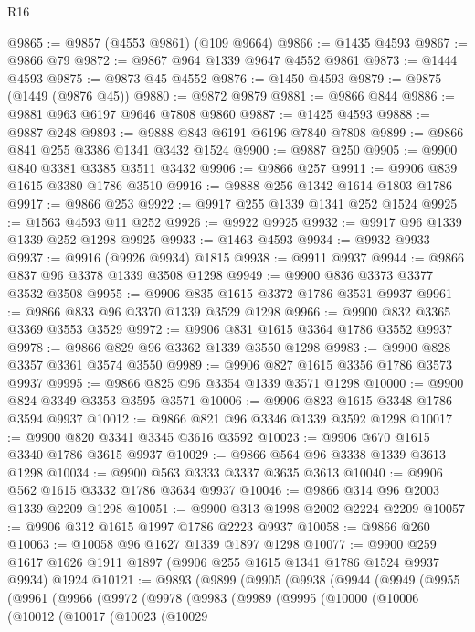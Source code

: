 \begin{lexlean}{R16}
\begin{coremodule}
@9865 := @9857 (@4553 @9861) (@109 @9664)
@9866 := @1435 @4593
@9867 := @9866 @79
@9872 := @9867 @964 @1339 @9647 @4552 @9861
@9873 := @1444 @4593
@9875 := @9873 @45 @4552
@9876 := @1450 @4593
@9879 := @9875 (@1449 (@9876 @45))
@9880 := @9872 @9879
@9881 := @9866 @844
@9886 := @9881 @963 @6197 @9646 @7808 @9860
@9887 := @1425 @4593
@9888 := @9887 @248
@9893 := @9888 @843 @6191 @6196 @7840 @7808
@9899 := @9866 @841 @255 @3386 @1341 @3432 @1524
@9900 := @9887 @250
@9905 := @9900 @840 @3381 @3385 @3511 @3432
@9906 := @9866 @257
@9911 := @9906 @839 @1615 @3380 @1786 @3510
@9916 := @9888 @256 @1342 @1614 @1803 @1786
@9917 := @9866 @253
@9922 := @9917 @255 @1339 @1341 @252 @1524
@9925 := @1563 @4593 @11 @252
@9926 := @9922 @9925
@9932 := @9917 @96 @1339 @1339 @252 @1298 @9925
@9933 := @1463 @4593
@9934 := @9932 @9933
@9937 := @9916 (@9926 @9934) @1815
@9938 := @9911 @9937
@9944 := @9866 @837 @96 @3378 @1339 @3508 @1298
@9949 := @9900 @836 @3373 @3377 @3532 @3508
@9955 := @9906 @835 @1615 @3372 @1786 @3531 @9937
@9961 := @9866 @833 @96 @3370 @1339 @3529 @1298
@9966 := @9900 @832 @3365 @3369 @3553 @3529
@9972 := @9906 @831 @1615 @3364 @1786 @3552 @9937
@9978 := @9866 @829 @96 @3362 @1339 @3550 @1298
@9983 := @9900 @828 @3357 @3361 @3574 @3550
@9989 := @9906 @827 @1615 @3356 @1786 @3573 @9937
@9995 := @9866 @825 @96 @3354 @1339 @3571 @1298
@10000 := @9900 @824 @3349 @3353 @3595 @3571
@10006 := @9906 @823 @1615 @3348 @1786 @3594 @9937
@10012 := @9866 @821 @96 @3346 @1339 @3592 @1298
@10017 := @9900 @820 @3341 @3345 @3616 @3592
@10023 := @9906 @670 @1615 @3340 @1786 @3615 @9937
@10029 := @9866 @564 @96 @3338 @1339 @3613 @1298
@10034 := @9900 @563 @3333 @3337 @3635 @3613
@10040 := @9906 @562 @1615 @3332 @1786 @3634 @9937
@10046 := @9866 @314 @96 @2003 @1339 @2209 @1298
@10051 := @9900 @313 @1998 @2002 @2224 @2209
@10057 := @9906 @312 @1615 @1997 @1786 @2223 @9937
@10058 := @9866 @260
@10063 := @10058 @96 @1627 @1339 @1897 @1298
@10077 := @9900 @259 @1617 @1626 @1911 @1897 (@9906 @255 @1615 @1341 @1786 @1524 @9937 @9934) @1924
@10121 := @9893
    (@9899
      (@9905
        (@9938
          (@9944
            (@9949
              (@9955
                (@9961
                  (@9966
                    (@9972
                      (@9978
                        (@9983
                          (@9989
                            (@9995
                              (@10000
                                (@10006
                                  (@10012
                                    (@10017
                                      (@10023
                                        (@10029

\end{coremodule}
\end{lexlean}

